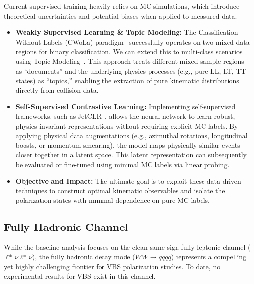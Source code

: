 \documentclass[12pt]{article}
\begin{document}
        Current supervised training heavily relies on MC simulations, which introduce theoretical uncertainties and potential biases when applied to measured data.
        \begin{itemize}
            \item \textbf{Weakly Supervised Learning \& Topic Modeling:} The Classification Without Labels (CWoLa) paradigm~\cite{Metodiev:2017vrx} successfully operates on two mixed data regions for binary classification. We can extend this to multi-class scenarios using Topic Modeling~\cite{Metodiev:2018ftz}. This approach treats different mixed sample regions as ``documents'' and the underlying physics processes (e.g., pure LL, LT, TT states) as ``topics,'' enabling the extraction of pure kinematic distributions directly from collision data.
            
            \item \textbf{Self-Supervised Contrastive Learning:} Implementing self-supervised frameworks, such as JetCLR~\cite{Dillon:2021gag}, allows the neural network to learn robust, physics-invariant representations without requiring explicit MC labels. By applying physical data augmentations (e.g., azimuthal rotations, longitudinal boosts, or momentum smearing), the model maps physically similar events closer together in a latent space. This latent representation can subsequently be evaluated or fine-tuned using minimal MC labels via linear probing.
            
            \item \textbf{Objective and Impact:} The ultimate goal is to exploit these data-driven techniques to construct optimal kinematic observables and isolate the polarization states with minimal dependence on pure MC labels.
        \end{itemize}


    \subsection{Fully Hadronic Channel}%
    \label{sub:fully_hadronic_channel}

        While the baseline analysis focuses on the clean same-sign fully leptonic channel ($\ell^\pm\nu\ell^\pm\nu$), the fully hadronic decay mode ($WW \to qqqq$) represents a compelling yet highly challenging frontier for VBS polarization studies. To date, no experimental results for VBS exist in this channel. 
\end{document}
